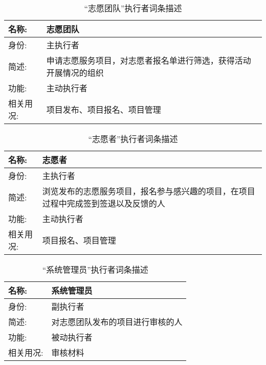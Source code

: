 
\begin{table}[H]  
\caption{“志愿团队”执行者词条描述}  
\begin{center}  
    \begin{tabular}{l p{11cm}} 
        \hline
        \quad 名称:  & 志愿团队 \\
        \hline
        \quad 身份:  & 主执行者 \\
        \hline
        \quad 简述:  & 申请志愿服务项目，对志愿者报名单进行筛选，获得活动开展情况的组织 \\
        \hline
        \quad 功能:  & 主动执行者 \\
        \hline
        \quad 相关用况:  & 项目发布、项目报名、项目管理 \\
        \hline
    \end{tabular}
\end{center}
\end{table}

\begin{table}[H]  
\caption{“志愿者”执行者词条描述}  
\begin{center}  
    \begin{tabular}{l p{11cm}} 
        \hline
        \quad 名称:  &   志愿者 \\
        \hline
        \quad 身份:  & 主执行者 \\
        \hline
        \quad 简述:  & 浏览发布的志愿服务项目，报名参与感兴趣的项目，在项目过程中完成签到签退以及反馈的人 \\
        \hline
        \quad 功能:  & 主动执行者 \\
        \hline
        \quad 相关用况:  & 项目报名、项目管理 \\
        \hline
    \end{tabular}
\end{center}
\end{table}

\begin{table}[H]  
\caption{“系统管理员”执行者词条描述}  
\begin{center}  
    \begin{tabular}{l p{11cm}} 
        \hline
        \quad 名称:  &  系统管理员 \\
        \hline
        \quad 身份:  & 副执行者 \\
        \hline
        \quad 简述:  & 对志愿团队发布的项目进行审核的人 \\
        \hline
        \quad 功能:  & 被动执行者 \\
        \hline
        \quad 相关用况:  & 审核材料 \\
        \hline
    \end{tabular}
\end{center}
\end{table}

